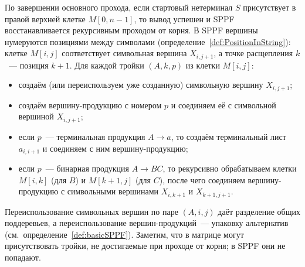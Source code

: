 По завершении основного прохода, если стартовый нетерминал $S$ присутствует в правой верхней клетке $M[0,n-1]$, то вывод успешен и SPPF восстанавливается рекурсивным проходом от корня.
В SPPF вершины нумеруются позициями между символами (определение~\ref{def:PositionInString}): клетке $M[i,j]$ соответствует символьная вершина $X_{i,j+1}$, а точке расщепления $k$~--- позиция $k+1$.
Для каждой тройки $(A, k, p)$ из клетки $M[i,j]$:
\begin{itemize}
    \item создаём (или переиспользуем уже созданную) символьную вершину $X_{i,j+1}$;
    \item создаём вершину-продукцию с номером $p$ и соединяем её с символьной вершиной $X_{i,j+1}$;
    \item если $p$~--- терминальная продукция $A \to a$, то создаём терминальный лист $a_{i,i+1}$ и соединяем с ним вершину-продукцию;
    \item если $p$~--- бинарная продукция $A \to B C$, то рекурсивно обрабатываем клетки $M[i,k]$ (для $B$) и $M[k+1,j]$ (для $C$), после чего соединяем вершину-продукцию с символьными вершинами $X_{i,k+1}$ и $X_{k+1,j+1}$.
\end{itemize}
Переиспользование символьных вершин по паре $(A, i, j)$ даёт разделение общих поддеревьев, а переиспользование вершин-продукций~--- упаковку альтернатив (см.~определение~\ref{def:basicSPPF}).
Заметим, что в матрице могут присутствовать тройки, не достигаемые при проходе от корня; в SPPF они не попадают.

